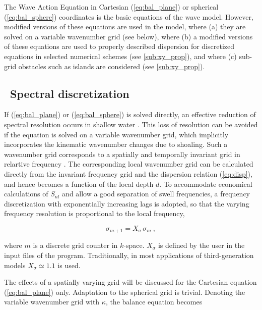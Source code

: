 The Wave Action Equation in Cartesian (\ref{eq:bal_plane}) or spherical (\ref{eq:bal_sphere}) coordinates is the basic
equations of the wave model. However, modified versions of these equations are
used in the model, where (a) they are solved on a variable wavenumber grid
(see below), where (b) a modified versions of these equations are used to
properly described dispersion for discretized equations in selected numerical
schemes (see \para\ref{sub:xy_prop}), and where (c) sub-grid obstacles such as
islands are considered (see \para\ref{sub:xy_prop}).


\vssub
\subsection{~Spectral discretization} \label{sec:basic_num}
\vsssub


If (\ref{eq:bal_plane}) or (\ref{eq:bal_sphere}) is solved directly, an
effective reduction of spectral resolution occurs in shallow water
\citep[see][]{tol:GAOS98b}. This loss of resolution can be avoided if the
equation is solved on a variable wavenumber grid, which implicitly
incorporates the kinematic wavenumber changes due to shoaling. Such a
wavenumber grid corresponds to a spatially and temporally invariant
grid in relartive frequency \citep{tol:GAOS98b}. The corresponding local wavenumber grid can be
calculated directly from the invariant frequency grid and the dispersion
relation (\ref{eq:disp}), and hence becomes a function of the local depth
$d$. To accommodate economical calculations of $S_{nl}$ and allow a good separation of swell frequencies, a frequency discretization with 
exponentially increasing lags is adopted, so that the varying frequency resolution is proportional to the local frequency, 


\begin{equation}
\sigma_{m+1} = X_\sigma \, \sigma_m \: , \label{eq:sigma_grid}
\end{equation}

\noindent
where $m$ is a discrete grid counter in $k$-space. $X_\sigma$ is defined by
the user in the input files of the program. Traditionally, in most
applications of third-generation models $X_\sigma \simeq 1.1$ is used.

The effects of a spatially varying grid will be discussed for the Cartesian
equation (\ref{eq:bal_plane}) only. Adaptation to the spherical grid is
trivial. Denoting the variable wavenumber grid with $\kappa$, the balance
equation becomes


